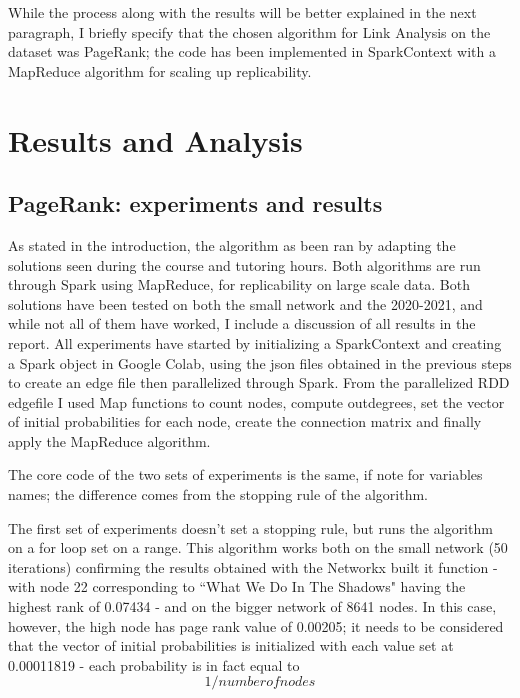 \documentclass[11pt]{article}
\begin{document}
While the process along with the results will be better explained in the next paragraph, I briefly specify that the chosen algorithm for Link Analysis on the dataset was PageRank; the code has been implemented in SparkContext with a MapReduce algorithm for scaling up replicability. 

\section{Results and Analysis}

\subsection{PageRank: experiments and results}

As stated in the introduction, the algorithm as been ran by adapting the solutions seen during the course and tutoring hours. 
Both algorithms are run through Spark using MapReduce, for replicability on large scale data. 
Both solutions have been tested on both the small network and the 2020-2021, and while not all of them have worked, I include a discussion of all results in the report.
All experiments have started by initializing a SparkContext and creating a Spark object in Google Colab, using the json files obtained in the previous steps to create an edge file then parallelized through Spark. From the parallelized RDD edgefile I used Map functions to count nodes, compute outdegrees, set the vector of initial probabilities for each node, create the connection matrix and finally apply the MapReduce algorithm.

The core code of the two sets of experiments is the same, if note for variables names; the difference comes from the stopping rule of the algorithm.

The first set of experiments doesn't set a stopping rule, but runs the algorithm on a for loop set on a range. This algorithm works both on the small network (50 iterations) confirming the results obtained with the Networkx built it function - with node 22 corresponding to ``What We Do In The Shadows" having the highest rank of 0.07434 - and on the bigger network of 8641 nodes. In this case, however, the high node has page rank value of 0.00205; it needs to be considered that the vector of initial probabilities is initialized with each value set at 0.00011819 - each probability is in fact equal to \begin{equation}
    1/ number of nodes
\end{equation}
\vspace{1mm}\\
\end{document}
